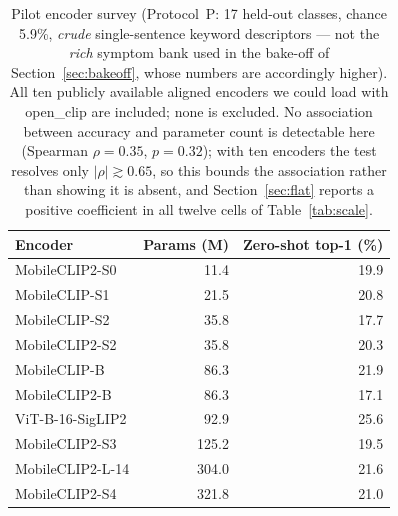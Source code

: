 \begin{table}[htbp]
\centering
\caption{Pilot encoder survey (Protocol~P: 17 held-out classes, chance 5.9\%, \emph{crude} single-sentence keyword descriptors --- not the \emph{rich} symptom bank used in the bake-off of Section~\ref{sec:bakeoff}, whose numbers are accordingly higher). All ten publicly available aligned encoders we could load with open\_clip are included; none is excluded. No association between accuracy and parameter count is detectable here (Spearman $\rho = 0.35$, $p = 0.32$); with ten encoders the test resolves only $|\rho| \gtrsim 0.65$, so this bounds the association rather than showing it is absent, and Section~\ref{sec:flat} reports a positive coefficient in all twelve cells of Table~\ref{tab:scale}.}
\label{tab:pilot}
\begin{tabular}{lrr}
\toprule
Encoder & Params (M) & Zero-shot top-1 (\%) \\
\midrule
MobileCLIP2-S0 & 11.4 & 19.9\\
MobileCLIP-S1 & 21.5 & 20.8\\
MobileCLIP-S2 & 35.8 & 17.7\\
MobileCLIP2-S2 & 35.8 & 20.3\\
MobileCLIP-B & 86.3 & 21.9\\
MobileCLIP2-B & 86.3 & 17.1\\
ViT-B-16-SigLIP2 & 92.9 & 25.6\\
MobileCLIP2-S3 & 125.2 & 19.5\\
MobileCLIP2-L-14 & 304.0 & 21.6\\
MobileCLIP2-S4 & 321.8 & 21.0\\
\bottomrule
\end{tabular}
\end{table}
